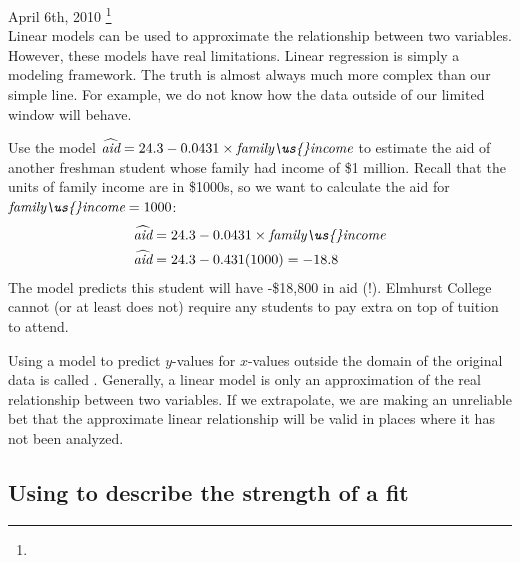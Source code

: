 \noindent\hspace{\textwidth}\hspace{-40mm}April 6th, 2010 \footnote{} \\

Linear models can be used to approximate the relationship between two variables. However, these models have real limitations. Linear regression is simply a modeling framework. The truth is almost always much more complex than our simple line. For example, we do not know how the data outside of our limited window will behave.

\D{\newpage}

\begin{examplewrap}
\begin{nexample}{Use the model $\widehat{\textit{aid}} = 24.3 - 0.0431\times \textit{family\us{}income}$ to estimate the aid of another freshman student whose family had income of \$1 million.}
Recall that the units of family income are in \$1000s, so we want to calculate the aid for $\textit{family\us{}income}= 1000$:
\begin{align*}
\widehat{\textit{aid}} &= 24.3 - 0.0431 \times \textit{family\us{}income} \\
\widehat{\textit{aid}}&=24.3 - 0.431(1000) = -18.8
\end{align*}
The model predicts this student will have -\$18,800 in aid (!). Elmhurst College cannot (or at least does not) require any students to pay extra on top of tuition to attend.
\end{nexample}
\end{examplewrap}

Using a model to predict $y$-values for $x$-values outside the domain of the original data is called . Generally, a linear model is only an approximation of the real relationship between two variables. If we extrapolate, we are making an unreliable bet that the approximate linear relationship will be valid in places where it has not been analyzed.




\subsection[Using $R^2$ to describe the strength of a fit]{Using  to describe the strength of a fit}


